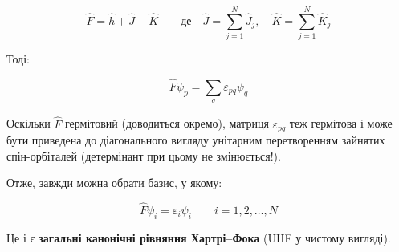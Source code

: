 \documentclass{PySCFBook}
\begin{document}
\[
\hat{F} = \hat{h} + \hat{J} - \hat{K}
\qquad\text{де}\quad
\hat{J} = \sum_{j=1}^N \hat{J}_j, \quad
\hat{K} = \sum_{j=1}^N \hat{K}_j
\]

Тоді:

\[
\hat{F} \psi_p = \sum_q \varepsilon_{pq} \psi_q
\]

Оскільки \(\hat{F}\) гермітовий (доводиться окремо), матриця \(\varepsilon_{pq}\) теж гермітова і може бути приведена до діагонального вигляду унітарним перетворенням зайнятих спін-орбіталей (детермінант при цьому не змінюється!).

Отже, завжди можна обрати базис, у якому:

\begin{equation}
\hat{F} \psi_i = \varepsilon_i \psi_i \qquad i = 1,2,\dots,N
\label{eq:general-canonical}
\end{equation}

Це і є \textbf{загальні канонічні рівняння Хартрі–Фока} (UHF у чистому вигляді).
\end{document}
